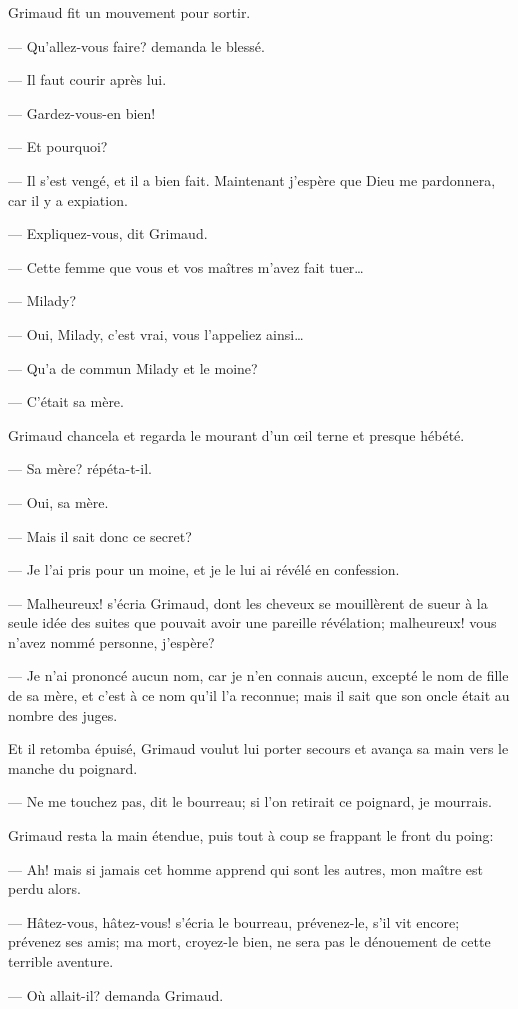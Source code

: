 Grimaud fit un mouvement pour sortir.

— Qu'allez-vous faire? demanda le blessé.

— Il faut courir après lui.

— Gardez-vous-en bien!

— Et pourquoi?

— Il s'est vengé, et il a bien fait. Maintenant j'espère que Dieu me pardonnera, car il y a expiation.

— Expliquez-vous, dit Grimaud.

— Cette femme que vous et vos maîtres m'avez fait tuer\dots

— Milady?

— Oui, Milady, c'est vrai, vous l'appeliez ainsi\dots

— Qu'a de commun Milady et le moine?

— C'était sa mère.

Grimaud chancela et regarda le mourant d'un œil terne et presque hébété.

— Sa mère? répéta-t-il.

— Oui, sa mère.

— Mais il sait donc ce secret?

— Je l'ai pris pour un moine, et je le lui ai révélé en confession.

— Malheureux! s'écria Grimaud, dont les cheveux se mouillèrent de sueur à la seule idée des suites que pouvait avoir une pareille révélation; malheureux! vous n'avez nommé personne, j'espère?

— Je n'ai prononcé aucun nom, car je n'en connais aucun, excepté le nom de fille de sa mère, et c'est à ce nom qu'il l'a reconnue; mais il sait que son oncle était au nombre des juges.

Et il retomba épuisé, Grimaud voulut lui porter secours et avança sa main vers le manche du poignard.

— Ne me touchez pas, dit le bourreau; si l'on retirait ce poignard, je mourrais.

Grimaud resta la main étendue, puis tout à coup se frappant le front du poing:

— Ah! mais si jamais cet homme apprend qui sont les autres, mon maître est perdu alors.

— Hâtez-vous, hâtez-vous! s'écria le bourreau, prévenez-le, s'il vit encore; prévenez ses amis; ma mort, croyez-le bien, ne sera pas le dénouement de cette terrible aventure.

— Où allait-il? demanda Grimaud.

